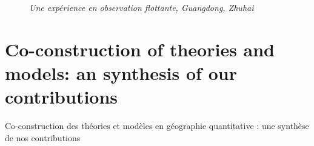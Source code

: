 \bigskip


\begin{figure}[h!]
\begin{mdframed}


 \textit{Une expérience en observation flottante, Guangdong, Zhuhai}
\end{mdframed}
\end{figure}




























\section[Co-construction of theories and models][Co-construction des théories et modèles]{Co-construction of theories and models: an synthesis of our contributions}{Co-construction des théories et modèles en géographie quantitative : une synthèse de nos contributions}



